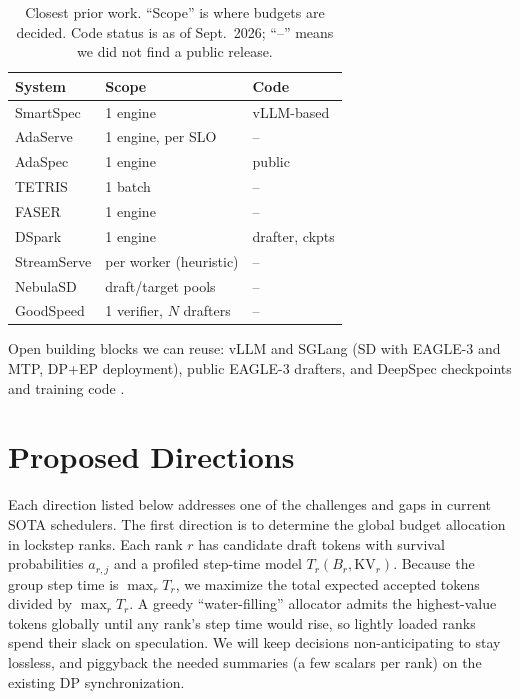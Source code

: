 \documentclass{article}
\begin{document}
\begin{table}[t]
\caption{Closest prior work. ``Scope'' is where budgets are decided.
Code status is as of Sept.\ 2026; ``--'' means we did not find a public release.}
\label{tab:sota}
\vskip 0.1in
\begin{center}
\begin{footnotesize}
\setlength{\tabcolsep}{4pt}
\begin{tabular}{lll}
\toprule
System & Scope & Code \\
\midrule
SmartSpec & 1 engine & vLLM-based \\
AdaServe & 1 engine, per SLO & -- \\
AdaSpec & 1 engine & public \\
TETRIS & 1 batch & -- \\
FASER & 1 engine & -- \\
DSpark & 1 engine & drafter, ckpts \\
StreamServe & per worker (heuristic) & -- \\
NebulaSD & draft/target pools & -- \\
GoodSpeed & 1 verifier, $N$ drafters & -- \\
\bottomrule
\end{tabular}
\end{footnotesize}
\end{center}
\vskip -0.15in
\end{table}

Open building blocks we can reuse: vLLM and SGLang (SD with EAGLE-3 and MTP,
DP+EP deployment), public EAGLE-3 drafters, and DeepSpec checkpoints and training
code \cite{cheng2026dspark}.

\section{Proposed Directions}
\label{sec:directions}

Each direction listed below addresses one of the challenges and gaps in current SOTA schedulers. The first direction is to determine the global budget allocation in lockstep ranks. Each rank $r$ has candidate draft tokens with survival probabilities $a_{r,j}$
and a profiled step-time model $T_r(B_r, \mathrm{KV}_r)$. Because the group step
time is $\max_r T_r$, we maximize the total expected accepted tokens divided by
$\max_r T_r$. A greedy ``water-filling'' allocator
admits the highest-value tokens globally until any rank's step time would rise,
so lightly loaded ranks spend their slack on speculation. We will keep decisions
non-anticipating to stay lossless, and piggyback the needed summaries
(a few scalars per rank) on the existing DP synchronization.
\end{document}
